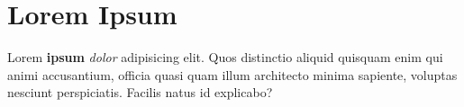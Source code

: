 \documentclass[12pt]{article}
\begin{document}
\section*{Lorem Ipsum}

Lorem \textbf{ipsum} \emph{dolor} adipisicing elit. Quos distinctio aliquid quisquam enim qui animi accusantium, officia quasi quam illum architecto minima sapiente, voluptas nesciunt perspiciatis. Facilis natus id explicabo?
\end{document}

